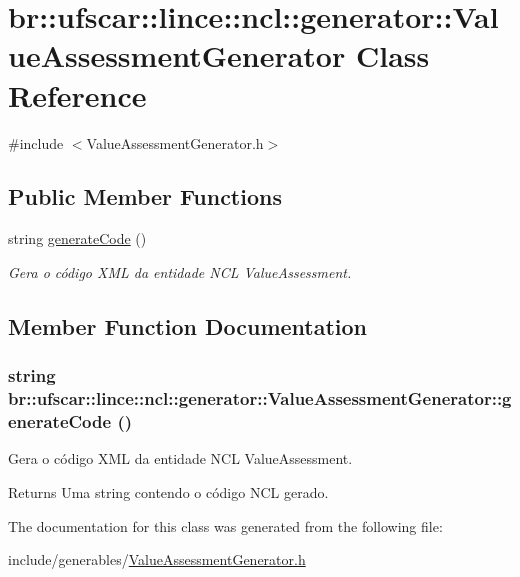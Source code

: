 \hypertarget{classbr_1_1ufscar_1_1lince_1_1ncl_1_1generator_1_1ValueAssessmentGenerator}{
\section{br::ufscar::lince::ncl::generator::ValueAssessmentGenerator Class Reference}
\label{classbr_1_1ufscar_1_1lince_1_1ncl_1_1generator_1_1ValueAssessmentGenerator}
}


{\ttfamily \#include $<$ValueAssessmentGenerator.h$>$}

\subsection*{Public Member Functions}
\begin{DoxyCompactItemize}
\item 
string \hyperlink{classbr_1_1ufscar_1_1lince_1_1ncl_1_1generator_1_1ValueAssessmentGenerator_af3e6f1d16d25889f052b1788ecc78a77}{generateCode} ()
\begin{DoxyCompactList}\small\item\em Gera o código XML da entidade NCL ValueAssessment. \item\end{DoxyCompactList}\end{DoxyCompactItemize}


\subsection{Member Function Documentation}
\hypertarget{classbr_1_1ufscar_1_1lince_1_1ncl_1_1generator_1_1ValueAssessmentGenerator_af3e6f1d16d25889f052b1788ecc78a77}{
\subsubsection[{generateCode}]{\setlength{\rightskip}{0pt plus 5cm}string br::ufscar::lince::ncl::generator::ValueAssessmentGenerator::generateCode ()}}
\label{classbr_1_1ufscar_1_1lince_1_1ncl_1_1generator_1_1ValueAssessmentGenerator_af3e6f1d16d25889f052b1788ecc78a77}


Gera o código XML da entidade NCL ValueAssessment. 

\begin{DoxyReturn}{Returns}
Uma string contendo o código NCL gerado. 
\end{DoxyReturn}


The documentation for this class was generated from the following file:\begin{DoxyCompactItemize}
\item 
include/generables/\hyperlink{ValueAssessmentGenerator_8h}{ValueAssessmentGenerator.h}\end{DoxyCompactItemize}
